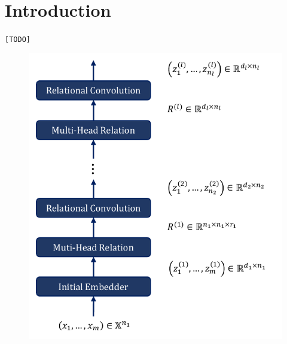 \section{Introduction}\label{sec:intro}

\texttt{[TODO]}



\begin{figure}[!ht]
    \centering
    \includegraphics{figs/relconv_architecture.pdf}
    \caption{}\label{fig:relconv_architecture}
\end{figure}